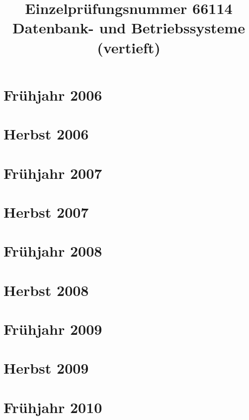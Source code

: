 \documentclass{lehramt-informatik-examen-sammlung}
\title{Einzelprüfungsnummer 66114\\Datenbank- und Betriebssysteme (vertieft)}
\begin{document}
\maketitle
\tableofcontents

\section{Frühjahr 2006}


\section{Herbst 2006}


\section{Frühjahr 2007}


\section{Herbst 2007}


\section{Frühjahr 2008}


\section{Herbst 2008}


\section{Frühjahr 2009}


\section{Herbst 2009}


\section{Frühjahr 2010}

\end{document}
